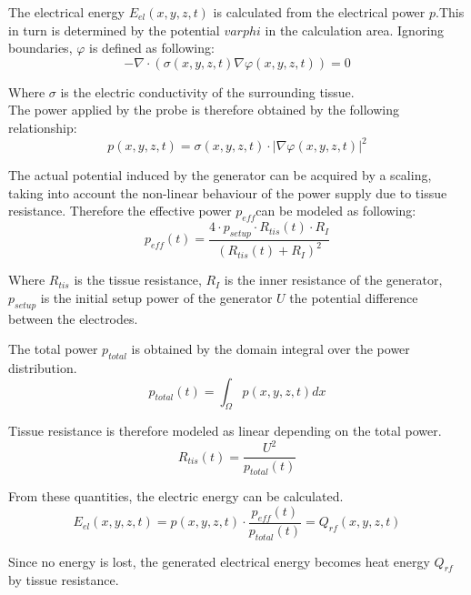 \documentclass[parskip=half, titlepage=yes, 12pt, BCOR=12mm, DIV=calc]{scrartcl}
\begin{document}
The electrical energy $E_{el}(x,y,z,t)$ is calculated from the electrical power $p$.This in turn is determined by the potential $varphi$ in the calculation area. Ignoring boundaries, $\varphi$ is defined as following:
\begin{equation}
    - \nabla \cdot (\sigma(x,y,z,t) \nabla \varphi(x,y,z,t)) = 0
\end{equation}

Where $\sigma$ is the electric conductivity of the surrounding tissue. \\
The power applied by the probe is therefore obtained by the following relationship:
\begin{equation}
    p(x,y,z,t) = \sigma(x,y,z,t) \cdot |\nabla \varphi(x,y,z,t)|^2
\end{equation}

The actual potential induced by the generator can be acquired by a scaling, taking into account the non-linear behaviour of the power supply due to tissue resistance. Therefore the effective power $p_{eff} $can be modeled as following:   
\begin{equation}
    p_{eff}(t) = \frac{4 \cdot p_{setup} \cdot R_{tis}(t) \cdot R_I}{(R_{tis}(t) + R_I)^2}
\end{equation}

Where $R_{tis}$ is the tissue resistance, $R_I$ is the inner resistance of the generator, $p_{setup}$ is the initial setup power of the generator $U$ the potential difference between the electrodes.

The total power $p_{total}$ is obtained by the domain integral over the power distribution.
\begin{equation}
    p_{total}(t) = \int_{\Omega} p(x,y,z,t) dx
\end{equation}

Tissue resistance is therefore modeled as linear depending on the total power.
\begin{equation}
    R_{tis}(t) = \frac{U^2}{p_{total}(t)}
\end{equation}

From these quantities, the electric energy can be calculated.
\begin{equation}
   E_{el}(x,y,z,t) = p(x,y,z,t) \cdot \frac{p_{eff}(t)}{p_{total}(t)} = Q_{rf}(x,y,z,t)
\end{equation}


Since no energy is lost, the generated electrical energy becomes heat energy $Q_{rf}$ by tissue resistance. \\
\end{document}
